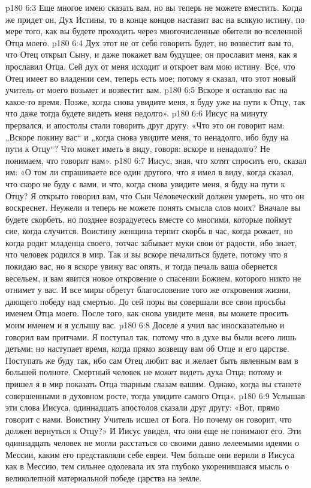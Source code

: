 \vs p180 6:3 Еще многое имею сказать вам, но вы теперь не можете вместить. Когда же придет он, Дух Истины, то в конце концов наставит вас на всякую истину, по мере того, как вы будете проходить через многочисленные обители во вселенной Отца моего.
\vs p180 6:4 Дух этот не от себя говорить будет, но возвестит вам то, что Отец открыл Сыну, и даже покажет вам будущее; он прославит меня, как я прославил Отца. Сей дух от меня исходит и откроет вам мою истину. Все, что Отец имеет во владении сем, теперь есть мое; потому я сказал, что этот новый учитель от моего возьмет и возвестит вам.
\vs p180 6:5 Вскоре я оставлю вас на какое\hyp{}то время. Позже, когда снова увидите меня, я буду уже на пути к Отцу, так что даже тогда будете видеть меня недолго».
\vs p180 6:6 Иисус на минуту прервался, и апостолы стали говорить друг другу: «Что это он говорит нам: „Вскоре покину вас“ и „когда снова увидите меня, то ненадолго, ибо буду на пути к Отцу“? Что может иметь в виду, говоря: вскоре и ненадолго? Не понимаем, что говорит нам».
\vs p180 6:7 Иисус, зная, что хотят спросить его, сказал им: «О том ли спрашиваете все один другого, что я имел в виду, когда сказал, что скоро не буду с вами, и что, когда снова увидите меня, я буду на пути к Отцу? Я открыто говорил вам, что Сын Человеческий должен умереть, но что он воскреснет. Неужели и теперь не можете понять смысла слов моих? Вначале вы будете скорбеть, но позднее возрадуетесь вместе со многими, которые поймут сие, когда случится. Воистину женщина терпит скорбь в час, когда рожает, но когда родит младенца своего, тотчас забывает муки свои от радости, ибо знает, что человек родился в мир. Так и вы вскоре печалиться будете, потому что я покидаю вас, но я вскоре увижу вас опять, и тогда печаль ваша обернется весельем, и вам явится новое откровение о спасении Божием, которого никто не отнимет у вас. И все миры обретут благословение того же откровения жизни, дающего победу над смертью. До сей поры вы совершали все свои просьбы именем Отца моего. После того, как снова увидите меня, вы можете просить моим именем и я услышу вас.
\vs p180 6:8 Доселе я учил вас иносказательно и говорил вам притчами. Я поступал так, потому что в духе вы были всего лишь детьми; но наступает время, когда прямо возвещу вам об Отце и его царстве. Поступать же буду так, ибо сам Отец любит вас и желает быть явленным вам в большей полноте. Смертный человек не может видеть духа Отца; потому и пришел я в мир показать Отца тварным глазам вашим. Однако, когда вы станете совершенными в духовном росте, тогда увидите самого Отца».
\vs p180 6:9 Услышав эти слова Иисуса, одиннадцать апостолов сказали друг другу: «Вот, прямо говорит с нами. Воистину Учитель исшел от Бога. Но почему он говорит, что должен вернуться к Отцу?» И Иисус увидел, что они еще не понимают его. Эти одиннадцать человек не могли расстаться со своими давно лелеемыми идеями о Мессии, каким его представляли себе евреи. Чем больше они верили в Иисуса как в Мессию, тем сильнее одолевала их эта глубоко укоренившаяся мысль о великолепной материальной победе царства на земле.
